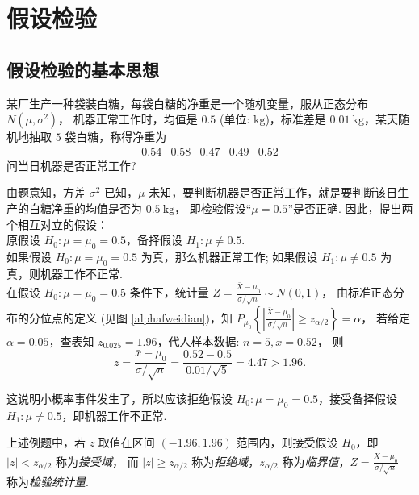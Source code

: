 \section{假设检验}

\subsection{假设检验的基本思想}

\begin{example}
    某厂生产一种袋装白糖，每袋白糖的净重是一个随机变量，服从正态分布 $ N\left(\mu, \sigma^{2}\right)$，
    机器正常工作时，均值是 $0.5$ (单位: $ \mathrm{kg}$)，标准差是 $ 0.01 \mathrm{~kg}$，某天随机地抽取 $5$ 袋白糖，称得净重为
    $$\begin{array}{lllll}
            0.54 & 0.58 & 0.47 & 0.49 & 0.52
        \end{array}$$
    问当日机器是否正常工作?
\end{example}
\begin{solution}
    由题意知，方差 $ \sigma^{2} $ 已知，$\mu $ 未知，要判断机器是否正常工作，就是要判断该日生产的白糖净重的均值是否为 $ 0.5 \mathrm{~kg} $，
    即检验假设“$\mu=0.5$”是否正确. 因此，提出两个相互对立的假设：\\
    原假设 $ H_{0}: \mu=\mu_{0}=0.5 $，备择假设 $ H_{1}: \mu \neq 0.5 .$\\
    如果假设 $ H_{0}: \mu=\mu_{0}=0.5 $ 为真，那么机器正常工作; 如果假设 $ H_{1}: \mu \neq 0.5 $ 为真，则机器工作不正常.\\
    在假设 $ H_{0}: \mu=\mu_{0}=0.5 $ 条件下，统计量 $\displaystyle Z=\frac{\bar{X}-\mu_{0}}{\sigma / \sqrt{n}} \sim N(0,1) $，
    由标准正态分布的分位点的定义 (见图 \ref{alphafweidian})，知 $ P_{\mu_{0}}\left\{\left|\frac{\bar{X}-\mu_{0}}{\sigma / \sqrt{n}}\right| \geqslant z_{\alpha / 2}\right\}=\alpha $，
    若给定 $ \alpha=0.05$，查表知 $ z_{0.025}=1.96$，代人样本数据: $ n=5, \bar{x}=0.52 $，
    则 $$\displaystyle z=\frac{\bar{x}-\mu_{0}}{\sigma / \sqrt{n}}=\frac{0.52-0.5}{0.01 / \sqrt{5}}=4.47>1.96 .$$

    这说明小概率事件发生了，所以应该拒绝假设 $ H_{0}: \mu=\mu_{0}=0.5 $，接受备择假设 $ H_{1}: \mu \neq 0.5 $，即机器工作不正常.
\end{solution}

\begin{definition}[接收域和拒绝域]
    上述例题中，若 $ z $ 取值在区间 $ (-1.96,1.96) $ 范围内，则接受假设 $ H_{0} $，即 $ |z|<z_{\alpha / 2} $ 称为\textit{接受域}，
    而 $ |z| \geqslant z_{\alpha / 2} $ 称为\textit{拒绝域}，$z_{\alpha / 2} $ 称为\textit{临界值}，$\displaystyle Z=\frac{\bar{X}-\mu_{0}}{\sigma / \sqrt{n}} $ 称为\textit{检验统计量}.
\end{definition}

